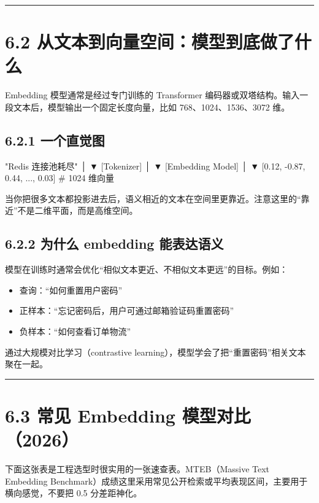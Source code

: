 \bigskip\hrule\bigskip

\section{6.2 从文本到向量空间：模型到底做了什么}

Embedding 模型通常是经过专门训练的 Transformer 编码器或双塔结构。输入一段文本后，模型输出一个固定长度向量，比如 768、1024、1536、3072 维。


\subsection{6.2.1 一个直觉图}

\begin{codeblock}
"Redis 连接池耗尽"
        │
        ▼
[Tokenizer]
        │
        ▼
[Embedding Model]
        │
        ▼
[0.12, -0.87, 0.44, ..., 0.03]   # 1024 维向量
\end{codeblock}

当你把很多文本都投影进去后，语义相近的文本在空间里更靠近。注意这里的``靠近''不是二维平面，而是高维空间。


\subsection{6.2.2 为什么 embedding 能表达语义}

模型在训练时通常会优化``相似文本更近、不相似文本更远''的目标。例如：


\begin{itemize}[leftmargin=2em]
\item 查询：``如何重置用户密码''
\item 正样本：``忘记密码后，用户可通过邮箱验证码重置密码''
\item 负样本：``如何查看订单物流''
\end{itemize}

通过大规模对比学习（contrastive learning），模型学会了把``重置密码''相关文本聚在一起。


\bigskip\hrule\bigskip

\section{6.3 常见 Embedding 模型对比（2026）}

下面这张表是工程选型时很实用的一张速查表。MTEB（Massive Text Embedding Benchmark）成绩这里采用常见公开检索或平均表现区间，主要用于横向感觉，不要把 0.5 分差距神化。


